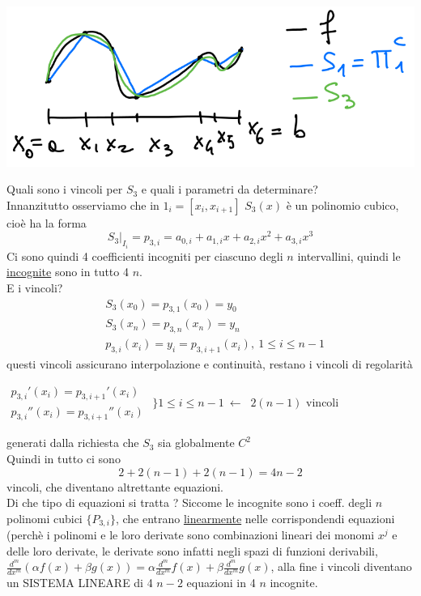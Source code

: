 \documentclass[12pt,a4paper]{article}
\begin{document}
\begin{center}
    \includegraphics[scale=0.4]{img_pag23.png}
\end{center}
Quali sono i vincoli per $S_3$ e quali i parametri da determinare?\\
Innanzitutto osserviamo che in $1_i=[x_i,x_{i+1}]$ $S_3(x)$ è un polinomio cubico, cioè ha la forma 
\begin{equation*}
    S_3 \vert _{I_i} = p_{3,i} = a_{0,i} + a_{1,i}x + a_{2,i}x^2 + a_{3,i}x^3
\end{equation*}
Ci sono quindi 4 coefficienti incogniti per ciascuno degli $n$ intervallini, quindi le \underline{incognite} sono in tutto 4 $n$. \\
E i vincoli?
\begin{align*}
 & S_3(x_0)=p_{3,1}(x_0)=y_0 \\ 
 & S_3(x_n)=p_{3,n}(x_n)=y_n\\ 
 & p_{3,i}(x_i)=y_i=p_{3,i+1}(x_i), \ 1 \leq i \leq n-1 
\end{align*}
questi vincoli assicurano interpolazione e continuità, restano i vincoli di regolarità\\
\begin{center}
$\begin{matrix}
p_{3,i}'(x_i) = p_{3,i+1}'(x_i)\\
p_{3,i}''(x_i) = p_{3,i+1}''(x_i)
\end{matrix}$
$\biggl\}1 \leq i \leq n-1 \ \longleftarrow \ $ $2(n-1)$ vincoli 
\end{center}
generati dalla richiesta che $S_3$ sia globalmente $C^2$\\ 
Quindi in tutto ci sono 
\begin{equation*}
    2 + 2(n-1) + 2(n-1) = 4n-2
\end{equation*}
vincoli, che diventano altrettante equazioni.\\
Di che tipo di equazioni si tratta ? Siccome le incognite sono i coeff. degli $n$ polinomi cubici $\{P_{3,i}\}$, che entrano \underline{linearmente} nelle corrispondendi equazioni (perchè i polinomi e le loro derivate sono combinazioni lineari dei monomi $x^j$ e delle loro derivate, le derivate sono infatti negli spazi di funzioni derivabili, $\frac{d^m}{dx^m}(\alpha f(x) + \beta g(x)) = \alpha \frac{d^m}{dx^m} f(x) + \beta \frac{d^m}{dx^m} g(x) $, alla fine i vincoli diventano un SISTEMA LINEARE di 4 $n-2$ equazioni in 4 $n$ incognite. \\
\end{document}
